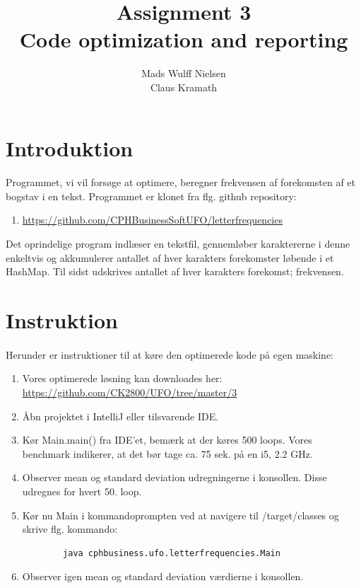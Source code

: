 \documentclass{article}
\title{%
Assignment 3 \\
\large Code optimization and reporting
}
\author{Mads Wulff Nielsen \\
Claus Kramath}
\begin{document}
\maketitle
\thispagestyle{empty}
\newpage
\tableofcontents
\thispagestyle{empty} 
\newpage
\section{Introduktion}
\paragraph{}
Programmet, vi vil forsøge at optimere, beregner frekvensen af forekomsten af et bogstav i en tekst. Programmet er klonet fra flg. github repository: 
\begin{enumerate}
    \item \url{https://github.com/CPHBusinessSoftUFO/letterfrequencies}
\end{enumerate}
Det oprindelige program indlæser en tekstfil, gennemløber karaktererne i denne enkeltvis og akkumulerer antallet af hver karakters forekomster løbende i et HashMap. Til sidst udskrives antallet af hver karakters forekomst; frekvensen.
\section{Instruktion}
\paragraph{}
Herunder er instruktioner til at køre den optimerede kode på egen maskine:
\begin{enumerate}
    \item Vores optimerede løsning kan downloades her: \\ \url{https://github.com/CK2800/UFO/tree/master/3}
    \item Åbn projektet i IntelliJ eller tilsvarende IDE.
    \item Kør Main.main() fra IDE'et, bemærk at der køres 500 loops. Vores benchmark indikerer, at det bør tage ca. 75 sek. på en i5, 2.2 GHz.
    \item Observer mean og standard deviation udregningerne i konsollen. Disse udregnes for hvert 50. loop.
    \item Kør nu Main i kommandoprompten ved at navigere til /target/classes og skrive flg. kommando:
    \begin{verbatim}
        java cphbusiness.ufo.letterfrequencies.Main
    \end{verbatim}
    
    \item Observer igen mean og standard deviation værdierne i konsollen.
\end{enumerate}
\newpage
\end{document}
